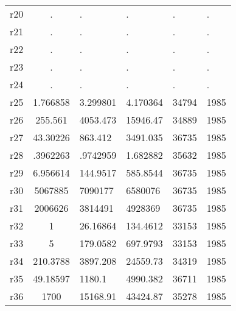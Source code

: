 \begin{tabular}{l*{1}{c}}
r20         &           .&           .&           .&           .&           .\\
r21         &           .&           .&           .&           .&           .\\
r22         &           .&           .&           .&           .&           .\\
r23         &           .&           .&           .&           .&           .\\
r24         &           .&           .&           .&           .&           .\\
r25         &    1.766858&    3.299801&    4.170364&       34794&        1985\\
r26         &     255.561&    4053.473&    15946.47&       34889&        1985\\
r27         &    43.30226&     863.412&    3491.035&       36735&        1985\\
r28         &    .3962263&    .9742959&    1.682882&       35632&        1985\\
r29         &    6.956614&    144.9517&    585.8544&       36735&        1985\\
r30         &     5067885&     7090177&     6580076&       36735&        1985\\
r31         &     2006626&     3814491&     4928369&       36735&        1985\\
r32         &           1&    26.16864&    134.4612&       33153&        1985\\
r33         &           5&    179.0582&    697.9793&       33153&        1985\\
r34         &    210.3788&    3897.208&    24559.73&       34319&        1985\\
r35         &    49.18597&      1180.1&    4990.382&       36711&        1985\\
r36         &        1700&    15168.91&    43424.87&       35278&        1985\\
\hline\hline
\end{tabular}
